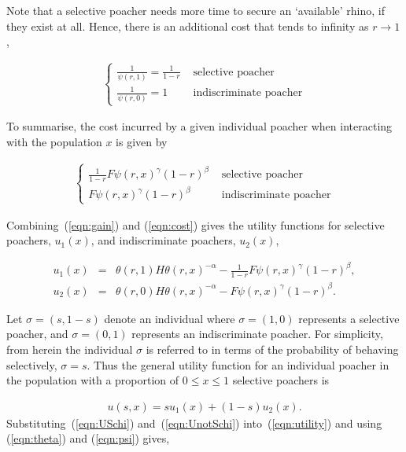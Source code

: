 \documentclass[10pt]{article}
\begin{document}
Note that a selective poacher needs
more time to secure an `available' rhino, if they exist at all. Hence, there is
an additional cost that tends to infinity as \(r \rightarrow 1\),

\begin{eqnarray}
    \label{eqn:selective_cost}
    \left\{
    \begin{array}{cl}
    \frac{1}{\psi(r, 1)} = \frac{1}{1 - r} & \mbox{ selective poacher}
    \\
    \frac{1}{\psi(r, 0)} = 1 & \mbox{ indiscriminate poacher}
    \end{array} \right.
\end{eqnarray}

To summarise, the cost incurred by a given individual poacher when interacting
with the population \(x\) is given by 

\begin{eqnarray}
    \label{eqn:cost}
    \left\{
    \begin{array}{cl}
    \frac{1}{1 - r}  F\psi(r, x)^{\gamma} (1-r)^{\beta}& \mbox{ selective poacher}
    \\
    F\psi(r, x)^{\gamma} (1-r)^{\beta}& \mbox{ indiscriminate poacher}
    \end{array} \right.
\end{eqnarray}

Combining~(\ref{eqn:gain}) and (\ref{eqn:cost}) gives the utility functions for
selective poachers, \(u_1(x)\), and indiscriminate poachers, \(u_2(x)\), 

\begin{eqnarray} 
\label{eqn:USchi}
u_1(x) &=& \theta(r,1) H \theta(r,x)^{-\alpha}
- \frac{1}{1- r} F\psi(r, x)^{\gamma} (1-r)^{\beta} ,
\\
\label{eqn:UnotSchi}
u_2(x) &=& \theta(r,0) H \theta(r,x)^{-\alpha}
- F\psi(r, x)^{\gamma}  (1-r)^{\beta}.
\end{eqnarray}


Let \(\sigma=(s, 1 - s)\) denote an individual where \(\sigma =(1, 0)\) represents
a selective poacher, and \(\sigma=(0, 1)\) represents an indiscriminate poacher.
For simplicity, from herein the individual \(\sigma\) is referred to in terms
of the probability of behaving selectively, \(\sigma=s\).
Thus the general utility function for an individual poacher in the population with
a proportion of \(0 \leq x \leq 1\) selective poachers is

\begin{eqnarray}
\label{eqn:utility}
u(s, x) = s u_1(x) +(1 - s) u_2(x).
\end{eqnarray}
Substituting~(\ref{eqn:USchi}) and~(\ref{eqn:UnotSchi}) into~(\ref{eqn:utility}) 
and using (\ref{eqn:theta}) and (\ref{eqn:psi}) gives,
\end{document}
